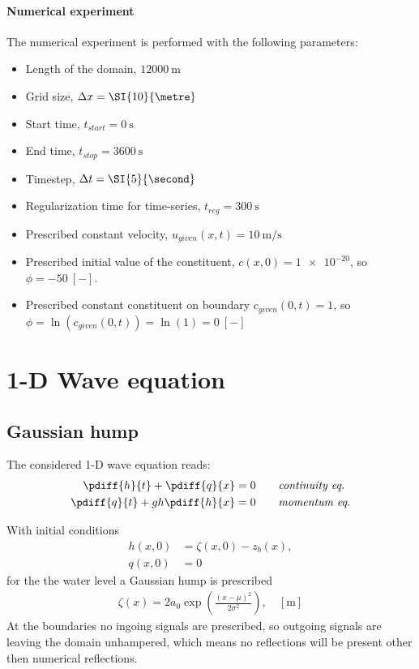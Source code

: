 \paragraph*{Numerical experiment}
The numerical experiment is performed with the following parameters:
\begin{itemize}
    \item Length of the domain, $\SI{12000}{\metre}$
    \item Grid size, $\Dx = \SI{10}{\metre}$
    \item Start time, $t_{start} = \SI{0}{\second}$
    \item End time, $t_{stop} = \SI{3600}{\second}$
    \item Timestep, $\Dt = \SI{5}{\second}$
    \item Regularization time for time-series, $t_{reg} = \SI{300}{\second}$
    \item Prescribed constant velocity, $u_{given}(x,t) = \SI{10}{\metre\per\second}$
    \item Prescribed initial value of the constituent, $c(x,0)= \num{1e-20}$, \newline so $\phi = \SI{-50}{[-]}$.
    \item Prescribed constant constituent on boundary $c_{given}(0,t) = 1$, \newline so $\phi = \ln(c_{given}(0,t)) = \ln(1) = \SI{0}{[-]}$
\end{itemize}
\section{1-D Wave equation}
\subsection{Gaussian hump}
The considered 1-D wave equation reads:
\begin{align}
    \pdiff{h}{t}  + \pdiff{q}{x} & = 0 \qquad \textit{continuity eq.} \\
    \pdiff{q}{t}  + g h \pdiff{h}{x} & = 0 \qquad \textit{momentum eq.}
\end{align}

With initial conditions
\begin{align}
    h(x,0) & = \zeta(x,0) - z_b(x),\\
    q(x,0) & = 0
\end{align}
for the the water level a Gaussian hump is prescribed
\begin{align}
    \zeta(x) = 2 a_0 \exp\left( \frac{(x - \mu)^2}{2\sigma^2}  \right), \quad [\si{\metre}]
\end{align}
At the boundaries no ingoing signals are prescribed, so outgoing signals are leaving the domain unhampered, which means no reflections will be present other then numerical reflections.

